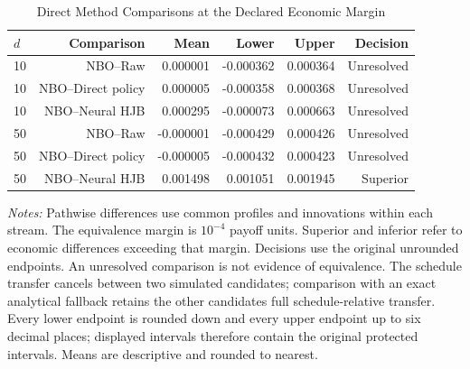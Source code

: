 \begin{table}[!htbp]
\centering\small
\caption{Direct Method Comparisons at the Declared Economic Margin}
\label{tab:r15methodcontrasts}
\begin{tabular}{lrrrrr}
\toprule
$d$ & Comparison & Mean & Lower & Upper & Decision \\
\midrule
10 & NBO--Raw & 0.000001 & -0.000362 & 0.000364 & Unresolved \\
10 & NBO--Direct policy & 0.000005 & -0.000358 & 0.000368 & Unresolved \\
10 & NBO--Neural HJB & 0.000295 & -0.000073 & 0.000663 & Unresolved \\
50 & NBO--Raw & -0.000001 & -0.000429 & 0.000426 & Unresolved \\
50 & NBO--Direct policy & -0.000005 & -0.000432 & 0.000423 & Unresolved \\
50 & NBO--Neural HJB & 0.001498 & 0.001051 & 0.001945 & Superior \\
\bottomrule
\end{tabular}
\par\medskip\noindent\begin{minipage}{\linewidth}\footnotesize\emph{Notes:} Pathwise differences use common profiles and innovations within each stream. The equivalence margin is $10^{-4}$ payoff units. Superior and inferior refer to economic differences exceeding that margin. Decisions use the original unrounded endpoints. An unresolved comparison is not evidence of equivalence. The schedule transfer cancels between two simulated candidates; comparison with an exact analytical fallback retains the other candidate\textquotesingle s full schedule-relative transfer. Every lower endpoint is rounded down and every upper endpoint up to six decimal places; displayed intervals therefore contain the original protected intervals. Means are descriptive and rounded to nearest.
\end{minipage}
\end{table}
